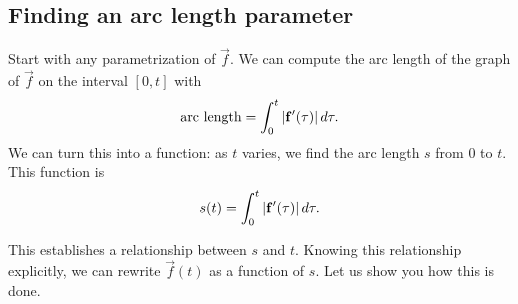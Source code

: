 \documentclass{ximera}
\begin{document}
\subsection{Finding an arc length parameter}

Start with any parametrization of $\vec{f}$. We can compute the arc
length of the graph of $\vec{f}$ on the interval $[0,t]$
with
\[
\text{arc length} = \int_0^t|\mathbf f'(\tau)|\mathop{}\!d \tau.
\]
We can
turn this into a function: as $t$ varies, we find the arc length $s$
from $0$ to $t$. This function is
\[
s(t) = \int_0^t |\mathbf{f}'(\tau)| \mathop{}\!d\tau.
\]

This establishes a relationship between $s$ and $t$. Knowing this
relationship explicitly, we can rewrite $\vec{f}(t)$ as a function of
$s$. Let us show you how this is done.



\end{document}
